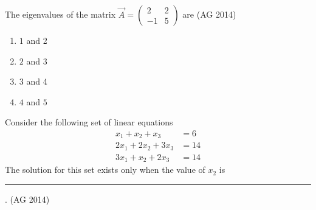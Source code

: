     \item The eigenvalues of the matrix $\vec{A} = \begin{pmatrix} 2 & 2 \\ -1 & 5 \end{pmatrix}$ are
    \hfill(AG 2014)
    \begin{multicols}{4}
    \begin{enumerate}
        \item $1$ and 2
        \item $2$ and 3
        \item $3$ and 4
        \item $4$ and $5$
    \end{enumerate}
    \end{multicols}
    \item Consider the following set of linear equations
    \begin{align*}
        x_1 + x_2 + x_3 &= 6 \\
        2x_1 + 2x_2 + 3x_3 &= 14 \\
        3x_1 + x_2 + 2x_3 &= 14
    \end{align*}
    The solution for this set exists only when the value of $x_2$ is \rule{1cm}{0.01pt}.
    \hfill(AG 2014)



